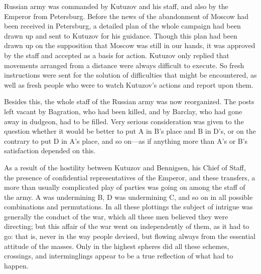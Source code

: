  Russian army was commanded by Kutuzov and his staff, and also
by the Emperor from Petersburg. Before the news of the
abandonment of Moscow had been received in Petersburg, a detailed
plan of the whole campaign had been drawn up and sent to Kutuzov
for his guidance. Though this plan had been drawn up on the
supposition that Moscow was still in our hands, it was approved
by the staff and accepted as a basis for action. Kutuzov only
replied that movements arranged from a distance were always
difficult to execute. So fresh instructions were sent for the
solution of difficulties that might be encountered, as well as
fresh people who were to watch Kutuzov's actions and report upon
them.

Besides this, the whole staff of the Russian army was now
reorganized.  The posts left vacant by Bagration, who had been
killed, and by Barclay, who had gone away in dudgeon, had to be
filled. Very serious consideration was given to the question
whether it would be better to put A in B's place and B in D's, or
on the contrary to put D in A's place, and so on---as if anything
more than A's or B's satisfaction depended on this.

As a result of the hostility between Kutuzov and Bennigsen, his
Chief of Staff, the presence of confidential representatives of
the Emperor, and these transfers, a more than usually complicated
play of parties was going on among the staff of the army. A was
undermining B, D was undermining C, and so on in all possible
combinations and permutations.  In all these plottings the
subject of intrigue was generally the conduct of the war, which
all these men believed they were directing; but this affair of
the war went on independently of them, as it had to go: that is,
never in the way people devised, but flowing always from the
essential attitude of the masses. Only in the highest spheres did
all these schemes, crossings, and interminglings appear to be a
true reflection of what had to happen.

